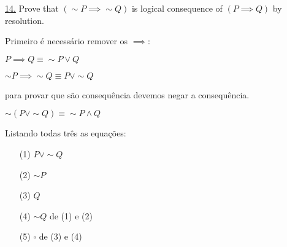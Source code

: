 \underline{14.} Prove that $ (\sim P \implies \sim Q) $ is logical consequence of $ (P \implies Q) $ by resolution.

Primeiro é necessário remover os $ \implies $:

$ P \implies Q \equiv \sim P \vee Q $

$ \sim P \implies \sim Q \equiv P \vee \sim Q$

para provar que são consequência devemos negar a consequência.

$\sim(P \vee \sim Q) \equiv \sim P \wedge Q$

Listando todas três as equações:
\begin{itemize}
 \item[(1)] $ P \vee \sim Q $
 \item[(2)] $\sim P$
 \item[(3)] $Q$
 \item[(4)] $ \sim Q $ de (1) e (2)
 \item[(5)] $ \square $ de (3) e (4)
\end{itemize}
